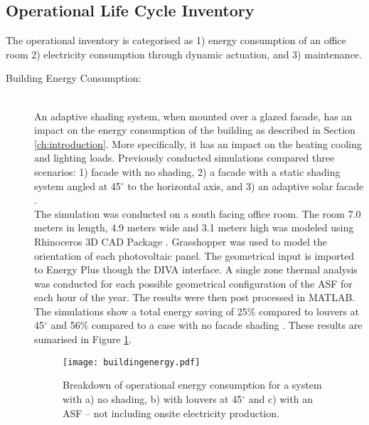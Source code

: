 \subsection{Operational Life Cycle Inventory}
\label{ch:Meth:Opp}

The operational inventory is categorised as 1) energy consumption of an office room 2) electricity consumption through dynamic actuation, and 3) maintenance.

\begin{description}


\item[Building Energy Consumption: ] \hfill\\
An adaptive shading system, when mounted over a glazed facade, has an impact on the energy consumption of the building as described in Section \ref{ch:introduction}. More specifically, it has an impact on the heating cooling and lighting loads. Previously conducted simulations compared three scenarios: 1) facade with no shading, 2) a facade with a static shading system angled at 45$^{\circ}$ to the horizontal axis, and 3) an adaptive solar facade \cite{jayathissa2015abs}.\\

The simulation was conducted on a south facing office room. The room 7.0 meters in length, 4.9 meters wide and 3.1 meters high was modeled using Rhinoceros 3D CAD Package \cite{Rhino}. Grasshopper \cite{grasshopper} was used to model the orientation of each photovoltaic panel. The geometrical input is imported to Energy Plus \cite{energyplus} though the DIVA \cite{DIVA} interface. A single zone thermal analysis was conducted for each possible geometrical configuration of the ASF for each hour of the year. The results were then post processed in MATLAB.\\

The simulations show a total energy saving of 25\% compared to louvers at 45$^\circ$ and 56\% compared to a case with no facade shading \cite{jayathissa2015abs}. These results are sumarised in Figure \ref{fig:operational}. \\


\begin{figure}[H]
\begin{center}
\texttt{[image: buildingenergy.pdf]}
\caption{Breakdown of operational energy consumption for a system with a) no shading, b) with louvers at 45$^\circ$ and c) with an ASF -- not including onsite electricity production.}
\label{fig:operational}
\end{center}
\end{figure}


\end{description}
